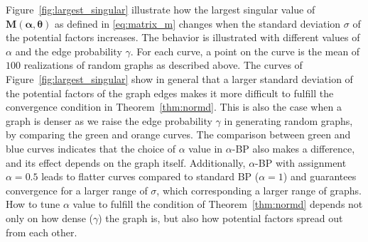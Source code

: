 Figure~\ref{fig:largest_singular} illustrate how the largest singular value of $\bm{M}(\bm{\alpha}, \bm{\theta})$ as defined in \eqref{eq:matrix_m} changes when the standard deviation $\sigma$ of the potential factors increases. The behavior is illustrated with different values of $\alpha$ and the edge probability $\gamma$. For each curve, a point on the curve is the mean of $100$ realizations of random graphs as described above. The curves of Figure~\ref{fig:largest_singular} show in general that a larger standard deviation of the potential factors of the graph edges makes it more difficult to fulfill the convergence condition in Theorem~\ref{thm:normd}. This is also the case when a graph is denser as we raise the edge probability $\gamma$ in generating random graphs, by comparing the green and orange curves. The comparison between green and blue curves indicates that the choice of $\alpha$ value in $\alpha$-BP also makes a difference, and its effect depends on the graph itself. Additionally, $\alpha$-BP with assignment $\alpha=0.5$ leads to flatter curves compared to standard BP ($\alpha=1$) and guarantees convergence for a larger range of $\sigma$, which corresponding a larger range of graphs.
How to tune $\alpha$ value to fulfill the condition of Theorem~\ref{thm:normd} depends not only on how dense ($\gamma$) the graph is, but also how potential factors spread out from each other.

